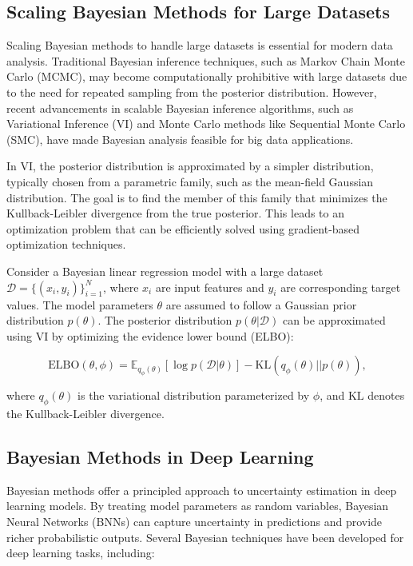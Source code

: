 \documentclass[12pt]{book} %
\begin{document}
\subsection{Scaling Bayesian Methods for Large Datasets}
Scaling Bayesian methods to handle large datasets is essential for modern data analysis. Traditional Bayesian inference techniques, such as Markov Chain Monte Carlo (MCMC), may become computationally prohibitive with large datasets due to the need for repeated sampling from the posterior distribution. However, recent advancements in scalable Bayesian inference algorithms, such as Variational Inference (VI) and Monte Carlo methods like Sequential Monte Carlo (SMC), have made Bayesian analysis feasible for big data applications.

In VI, the posterior distribution is approximated by a simpler distribution, typically chosen from a parametric family, such as the mean-field Gaussian distribution. The goal is to find the member of this family that minimizes the Kullback-Leibler divergence from the true posterior. This leads to an optimization problem that can be efficiently solved using gradient-based optimization techniques.

Consider a Bayesian linear regression model with a large dataset \( \mathcal{D} = \{(x_i, y_i)\}_{i=1}^N \), where \( x_i \) are input features and \( y_i \) are corresponding target values. The model parameters \( \theta \) are assumed to follow a Gaussian prior distribution \( p(\theta) \). The posterior distribution \( p(\theta | \mathcal{D}) \) can be approximated using VI by optimizing the evidence lower bound (ELBO):

\[
\text{ELBO}(\theta, \phi) = \mathbb{E}_{q_{\phi}(\theta)}[\log p(\mathcal{D} | \theta)] - \text{KL}(q_{\phi}(\theta) || p(\theta)),
\]

where \( q_{\phi}(\theta) \) is the variational distribution parameterized by \( \phi \), and \( \text{KL} \) denotes the Kullback-Leibler divergence.

\subsection{Bayesian Methods in Deep Learning}
Bayesian methods offer a principled approach to uncertainty estimation in deep learning models. By treating model parameters as random variables, Bayesian Neural Networks (BNNs) can capture uncertainty in predictions and provide richer probabilistic outputs. Several Bayesian techniques have been developed for deep learning tasks, including:
\end{document}
